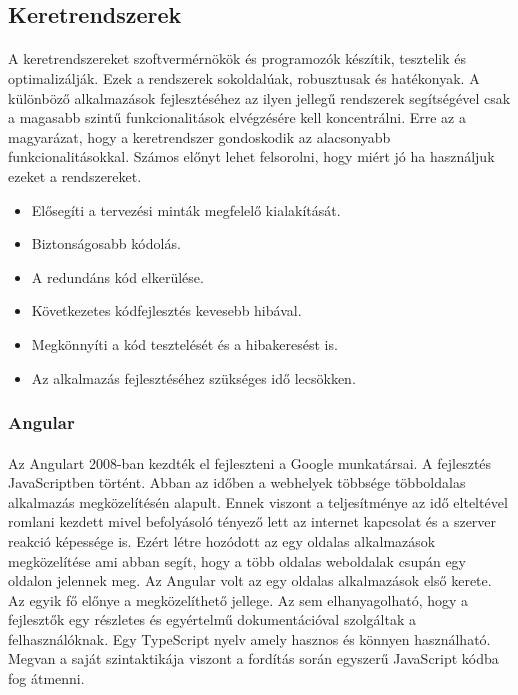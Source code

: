 \documentclass{article}
\begin{document}
	\subsection{Keretrendszerek}
	\paragraph{}
	A keretrendszereket szoftvermérnökök és programozók készítik, tesztelik és optimalizálják. Ezek a rendszerek sokoldalúak, robusztusak és hatékonyak. A különböző alkalmazások fejlesztéséhez az ilyen jellegű rendszerek segítségével csak a magasabb szintű funkcionalitások elvégzésére kell koncentrálni. Erre az a magyarázat, hogy a keretrendszer gondoskodik az alacsonyabb funkcionalitásokkal. Számos előnyt lehet felsorolni, hogy miért jó ha használjuk ezeket a rendszereket.\cite{frameworks}
	\begin{itemize}
		\item Elősegíti a tervezési minták megfelelő kialakítását.
		\item Biztonságosabb kódolás.
		\item A redundáns kód elkerülése.
		\item Következetes kódfejlesztés kevesebb hibával.
		\item Megkönnyíti a kód tesztelését és a hibakeresést is.
		\item Az alkalmazás fejlesztéséhez szükséges idő lecsökken.
	\end{itemize}

	\subsubsection{Angular}
	\paragraph{}
	Az Angulart 2008-ban kezdték el fejleszteni a Google munkatársai. A fejlesztés JavaScriptben történt. Abban az időben a webhelyek többsége többoldalas alkalmazás megközelítésén alapult. Ennek viszont a teljesítménye az idő elteltével romlani kezdett mivel befolyásoló tényező lett az internet kapcsolat és a szerver reakció képessége is. Ezért létre hozódott az egy oldalas alkalmazások megközelítése ami abban segít, hogy a több oldalas weboldalak csupán egy oldalon jelennek meg. Az Angular volt az egy oldalas alkalmazások első kerete. Az egyik fő előnye a megközelíthető jellege. Az sem elhanyagolható, hogy a fejlesztők egy részletes és egyértelmű dokumentációval szolgáltak a felhasználóknak. Egy TypeScript nyelv amely hasznos és könnyen használható. Megvan a saját szintaktikája viszont a fordítás során egyszerű JavaScript kódba fog átmenni.\cite{wohlgethan2018supportingweb}
	
\end{document}
